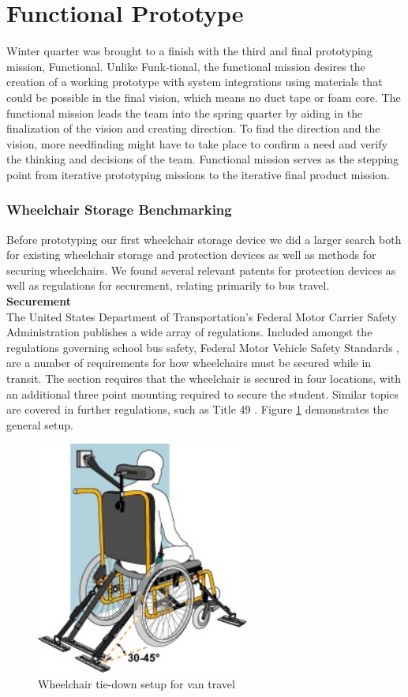 \section{Functional Prototype}
Winter quarter was brought to a finish with the third and final prototyping mission, Functional.  Unlike Funk-tional, the functional mission desires the creation of a working prototype with system integrations using materials that could be possible in the final vision, which means no duct tape or foam core. The functional mission leads the team into the spring quarter by aiding in the finalization of the vision and creating direction.  To find the direction and the vision, more needfinding might have to take place to confirm a need and verify the thinking and decisions of the team. Functional mission serves as the stepping point from iterative prototyping missions to the iterative final product mission.

\subsubsection{Wheelchair Storage Benchmarking}
Before prototyping our first wheelchair storage device we did a larger search both for existing wheelchair storage and protection devices as well as methods for securing wheelchairs. We found several relevant patents for protection devices as well as regulations for securement, relating primarily to bus travel. \\

\noindent\textbf{Securement}\\
The United States Department of Transportation's Federal Motor Carrier Safety Administration publishes a wide array of regulations. Included amongst the regulations governing school bus safety, Federal Motor Vehicle Safety Standards  \cite{fmvs222}, are a number of requirements for how wheelchairs must be secured while in transit. The section requires that the wheelchair is secured in four locations, with an additional three point mounting required to secure the student. Similar topics are covered in further regulations, such as Title 49  \cite{ecfr}. Figure \ref{fig:tie-down} demonstrates the general setup. 

\begin{figure}[h]
  \centering
     \includegraphics[width=7cm]{images/wc_van.jpg}
   \caption{Wheelchair tie-down setup for van travel}
  \label{fig:tie-down}
\end{figure}

